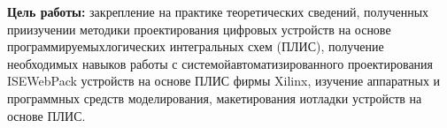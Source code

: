 \documentclass[a4paper, 14pt]{extarticle}
\begin{document}
    \graphicspath{{images/}{images2/}} %
    \captionsetup{labelsep=endash}
    \renewcommand{\figurename}{Рисунок}

    \newcommand{\imageinsert}[4]{
        \begin{figure}[H]
            \centering
            \texttt{[image: \#1]}
            \caption{#3}\label{#4}
        \end{figure}
    }

    \author{М.А.Гейне}
    \bmstutitlelab

    \textbf{Цель работы:} 
    закрепление на практике теоретических сведений, полученных приизучении   методики   проектирования   цифровых   устройств   на   основе   программируемыхлогических интегральных схем (ПЛИС), получение необходимых навыков работы с системойавтоматизированного проектирования  ISEWebPack  устройств на основе ПЛИС фирмы Xilinx, изучение аппаратных и программных средств моделирования, макетирования иотладки устройств на основе ПЛИС.
\end{document}

